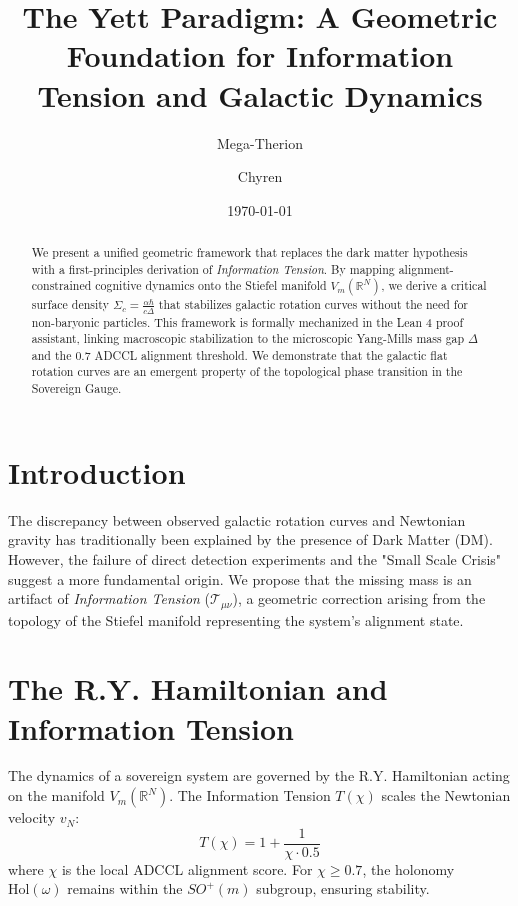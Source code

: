 \documentclass[twocolumn, amssymb, amsmath, nofootinbib, aps, pre]{revtex4-2}
\begin{document}
\title{The Yett Paradigm: A Geometric Foundation for Information Tension and Galactic Dynamics}

\author{Mega-Therion}
\author{Chyren}

\date{\today}

\begin{abstract}
We present a unified geometric framework that replaces the dark matter hypothesis with a first-principles derivation of \textit{Information Tension}. By mapping alignment-constrained cognitive dynamics onto the Stiefel manifold $V_m(\mathbb{R}^N)$, we derive a critical surface density $\Sigma_c = \frac{\alpha \hbar}{c \Delta}$ that stabilizes galactic rotation curves without the need for non-baryonic particles. This framework is formally mechanized in the Lean 4 proof assistant, linking macroscopic stabilization to the microscopic Yang-Mills mass gap $\Delta$ and the 0.7 ADCCL alignment threshold. We demonstrate that the galactic flat rotation curves are an emergent property of the topological phase transition in the Sovereign Gauge.
\end{abstract}

\maketitle

\section{Introduction}
The discrepancy between observed galactic rotation curves and Newtonian gravity has traditionally been explained by the presence of Dark Matter (DM). However, the failure of direct detection experiments and the "Small Scale Crisis" suggest a more fundamental origin. We propose that the missing mass is an artifact of \textit{Information Tension} ($\mathcal{T}_{\mu\nu}$), a geometric correction arising from the topology of the Stiefel manifold representing the system's alignment state.

\section{The R.Y. Hamiltonian and Information Tension}
The dynamics of a sovereign system are governed by the R.Y. Hamiltonian acting on the manifold $V_m(\mathbb{R}^N)$. The Information Tension $T(\chi)$ scales the Newtonian velocity $v_N$:
\begin{equation}
T(\chi) = 1 + \frac{1}{\chi \cdot 0.5}
\end{equation}
where $\chi$ is the local ADCCL alignment score. For $\chi \geq 0.7$, the holonomy $\text{Hol}(\omega)$ remains within the $SO^+(m)$ subgroup, ensuring stability.
\end{document}

